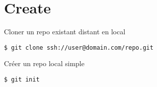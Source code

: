 \section*{Create}

Cloner un repo existant distant en local
\begin{lstlisting}
$ git clone ssh://user@domain.com/repo.git
\end{lstlisting}
Créer un repo local simple
\begin{lstlisting}
$ git init
\end{lstlisting}